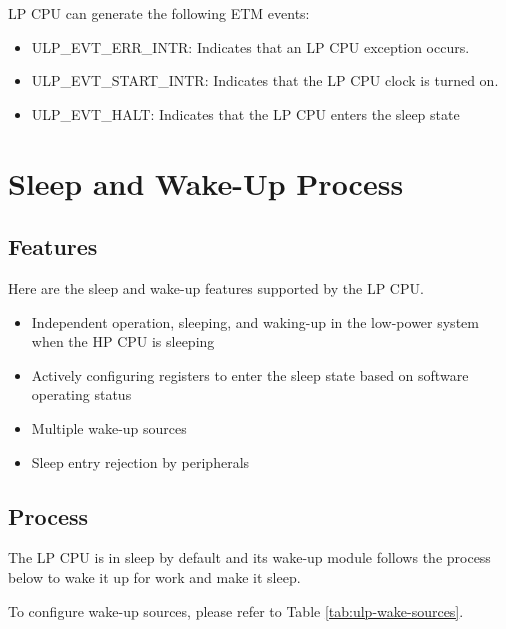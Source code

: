 \documentclass[main\_\_EN.tex]{subfiles}
\begin{document}
LP CPU can generate the following ETM events:

\begin{itemize}
    \item ULP\_EVT\_ERR\_INTR: Indicates that an LP CPU exception occurs.
    \item ULP\_EVT\_START\_INTR: Indicates that the LP CPU clock is turned on.
    \item ULP\_EVT\_HALT: Indicates that the LP CPU enters the sleep state

\end{itemize}




\section{Sleep and Wake-Up Process}\label{sec:sleep}
\subsection{Features}

Here are the sleep and wake-up features supported by the LP CPU.

\begin{itemize}
    \item Independent operation, sleeping, and waking-up in the low-power system when the HP CPU is sleeping
    \item Actively configuring registers to enter the sleep state based on software operating status
    \item Multiple wake-up sources
   \item Sleep entry rejection by peripherals
\end{itemize}

\subsection{Process}

The LP CPU is in sleep by default and its wake-up module follows the process below to wake it up for work and make it sleep.

To configure wake-up sources, please refer to Table \ref{tab:ulp-wake-sources}.
\end{document}
